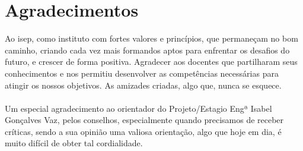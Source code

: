 \chapter*{Agradecimentos}
\label{Agradecimentos}
Ao \ac{isep}, como instituto com fortes valores e princípios, que permaneçam no bom caminho, criando cada vez mais formandos aptos para enfrentar os desafios do futuro, e crescer de forma positiva. Agradecer aos docentes que partilharam seus conhecimentos e nos permitiu desenvolver as competências necessárias para atingir os nossos objetivos. As amizades criadas, algo que, nunca se esquece.\\
\\
Um especial agradecimento ao orientador do Projeto/Estagio Engª Isabel Gonçalves Vaz, pelos conselhos, especialmente quando precisamos de receber críticas, sendo a sua opinião uma valiosa orientação, algo que hoje em dia, é muito difícil de obter tal cordialidade.
\vfil\vfil\null
\cleardoublepage